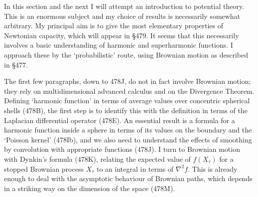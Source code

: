 
\def\energy{\mathop{\text{energy}}\nolimits}
\def\hp{\mathop{\text{hp}}\nolimits}
\def\varinnerprod#1#2{#1\dotproduct#2}
\def\zz{}

\newdimen\pagegoalminus
\newdimen\bigbaselineskip
\bigbaselineskip=36pt

\def\checkbreak{\noalign{\global\advance\pagetotalplus by \bigbaselineskip
\ifdim\pagetotalplus>\pagegoalminus\break
  \global\pagetotalplus=0pt\global\pagegoalminus=\pagegoal\fi}}


\def\chaptername{Geometric measure theory}
\def\sectionname{Harmonic functions}


In this section and the next I will attempt an introduction to potential
theory.   This is an enormous subject and my choice of results is
necessarily somewhat arbitrary.   My principal aim is to give the most
elementary properties of Newtonian capacity, which will appear in \S479.
It seems that this necessarily involves a basic understanding of harmonic
and superharmonic functions.   I approach these by the `probabilistic'
route, using Brownian motion as described in \S477.

The first few paragraphs, down to 478J, do not
in fact involve Brownian motion;
they rely on multidimensional advanced calculus and on the Divergence
Theorem.      Defining `harmonic
function' in terms of average values over concentric
spherical shells (478B), the
first step is to identify this with the definition in terms of the
Laplacian differential operator (478E).   An essential result is a formula
for a harmonic function inside a sphere in terms of its values on the
boundary and the `Poisson kernel' (478Ib),
and we also need to understand the effects of smoothing
by convolution with appropriate functions (478J).
I turn to Brownian motion with Dynkin's formula (478K), relating the
expected value of $f(X_{\tau})$ for
a stopped Brownian process $X_{\tau}$
to an integral in terms of $\nabla^2f$.   This is already enough to deal
with the asymptotic behaviour
of Brownian paths, which depends in a striking way on the dimension of the
space (478M).

